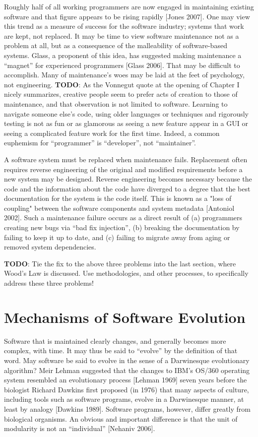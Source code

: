 Roughly half of all working programmers are now engaged in maintaining existing software and that figure appears to be rising rapidly [Jones 2007].  One may view this trend as a measure of success for the software industry; systems that work are kept, not replaced.  It may be time to view software maintenance not as a problem at all, but as a consequence of the malleability of software-based systems.  Glass, a proponent of this idea, has suggested making maintenance a ``magnet'' for experienced programmers [Glass 2006].  That may be difficult to accomplish. Many of maintenance's woes may be laid at the feet of psychology, not engineering.  \textbf{TODO}: As the Vonnegut quote at the opening of Chapter I nicely summarizes, creative people seem to prefer acts of creation to those of maintenance, and that observation is not limited to software.  Learning to navigate someone else's code, using older languages or techniques and rigorously testing is not as fun or as glamorous as seeing a new feature appear in a GUI or seeing a complicated feature work for the first time.  Indeed, a common euphemism for ``programmer'' is ``developer'', not ``maintainer''.

A software system must be replaced when maintenance fails.  Replacement often requires reverse engineering of the original and modified requirements before a new system may be designed. Reverse engineering becomes necessary because the code and the information about the code have diverged to a degree that the best documentation for the system is the code itself. This is known as a "loss of coupling" between the software components and system metadata [Antoniol 2002].  Such a maintenance failure occurs as a direct result of (a) programmers creating new bugs via ``bad fix injection'', (b) breaking the documentation by failing to keep it up to date, and (c) failing to migrate away from aging or removed system dependencies.

\textbf{TODO}: Tie the fix to the above three problems into the last section, where Wood's Law is discussed. Use methodologies, and other processes, to specifically address these three problems!


\section{Mechanisms of Software Evolution}

Software that is maintained clearly changes, and generally becomes more complex, with time.  It may thus be said to ``evolve'' by the definition of that word.  May software be said to evolve in the sense of a Darwinesque evolutionary algorithm?  Meir Lehman suggested that the changes to IBM's OS/360 operating system resembled an evolutionary process [Lehman 1969] seven years before the biologist Richard Dawkins first proposed (in 1976) that many aspects of culture, including tools such as software programs, evolve in a Darwinesque manner, at least by analogy [Dawkins 1989].  Software programs, however, differ greatly from biological organisms.  An obvious and important difference is that the unit of modularity is not an ``individual'' [Nehaniv 2006].

